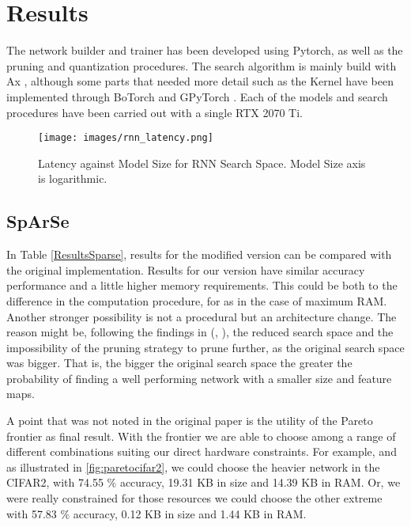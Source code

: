 \documentclass[a4paper, twocolumn]{article}
\begin{document}
\section{Results}

The network builder and trainer has been developed using Pytorch, as well as the pruning and quantization procedures. The search algorithm is mainly build with Ax \cite{Bakshy2018a}, although some parts that needed more detail such as the Kernel have been implemented through BoTorch \cite{Balandat2019} and GPyTorch \cite{Gardner2018}. Each of the models and search procedures have been carried out with a single RTX 2070 Ti. 

\begin{figure}
	\centering
	\texttt{[image: images/rnn\_latency.png]}
	\caption{Latency against Model Size for RNN Search Space. Model Size axis is logarithmic.  }
	\label{fig:latency}
\end{figure}

\subsection{SpArSe}

In Table \ref{ResultsSparse}, results for the modified version can be compared with the original implementation. Results for our version have similar accuracy performance and a little higher memory requirements. This could be both to the difference in the computation procedure, for as in the case of maximum RAM. Another stronger possibility is not a procedural but an architecture change. The reason might be, following the findings in (\cite{Frankle2019}, \cite{Cai2019f}), the reduced search space and the impossibility of the pruning strategy to prune further, as the original search space was bigger. That is, the bigger the original search space the greater the probability of finding a well performing network with a smaller size and feature maps. 

A point that was not noted in the original paper is the utility of the Pareto frontier as final result. With the frontier we are able to choose among a range of different combinations suiting our direct hardware constraints. For example, and as illustrated in \ref{fig:paretocifar2}, we could choose the heavier network in the CIFAR2, with 74.55 $\%$ accuracy, 19.31 KB in size and 14.39 KB in RAM. Or, we were really constrained for those resources we could choose the other extreme with 57.83 $\%$ accuracy, 0.12 KB  in size and 1.44 KB in RAM. 
\end{document}

